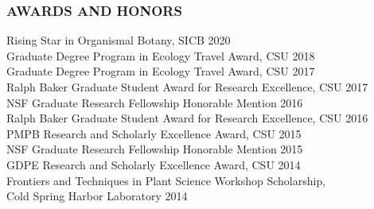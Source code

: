 \documentclass[12pt,english]{article}
\begin{document}

\subsubsection*{AWARDS AND HONORS}
\vspace{-0.5ex}
\hspace*{1.0em} Rising Star in Organismal Botany, SICB \hfill2020
\vspace{1ex}\\
\hspace*{1.0em} Graduate Degree Program in Ecology Travel Award, CSU \hfill2018
\vspace{1ex}\\
\hspace*{1.0em} Graduate Degree Program in Ecology Travel Award, CSU \hfill2017
\vspace{1ex}\\
\hspace*{1.0em} Ralph Baker Graduate Student Award for Research Excellence, CSU 
\hfill
2017
\vspace{1ex}\\
\hspace*{1.0em} NSF Graduate Research Fellowship Honorable Mention
\hfill
2016
\vspace{1ex}\\
\hspace*{1.0em} Ralph Baker Graduate Student Award for Research Excellence, CSU 
\hfill
2016
\vspace{1ex}\\
\hspace*{1.0em} PMPB Research and Scholarly Excellence Award, CSU 
\hfill
2015
\vspace{1ex}\\
\hspace*{1.0em} NSF Graduate Research Fellowship Honorable Mention
\hfill
2015
\vspace{1ex}\\
\hspace*{1.0em} GDPE Research and Scholarly Excellence Award, CSU
\hfill
2014
\vspace{1ex}\\
\hspace*{1.0em}  Frontiers and Techniques in Plant Science Workshop Scholarship,\\
\hspace*{1.0em} Cold Spring Harbor Laboratory 
\hfill
2014
\vspace{1ex}
\end{document}
